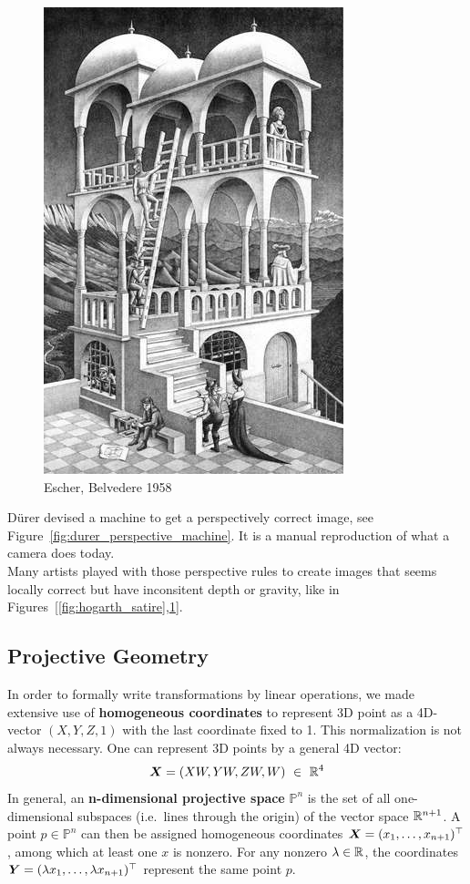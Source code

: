 \begin{figure}[h]
\centering
\includegraphics[width=0.5\columnwidth]{assets/img/escher_belvedere.jpg}
\caption{Escher, Belvedere 1958}%
\label{fig:escher_belvedere}
\end{figure}

D\"urer devised a machine to get a perspectively correct image,
see Figure~\ref{fig:durer_perspective_machine}.
It is a manual reproduction of what a camera does today.\\

Many artists played with those perspective rules to create images
that seems locally correct but have inconsitent depth or gravity, like
in Figures~[\ref{fig:hogarth_satire},\ref{fig:escher_belvedere}].


\subsection{Projective Geometry}%
\label{sub:projective_geometry}


In order to formally write transformations by linear operations,
we made extensive use of \textbf{homogeneous coordinates} to represent
3D point as a 4D-vector $(X,Y,Z,1)$ with the last coordinate fixed to 1.
This normalization is not always necessary. One can represent 3D points
by a general 4D vector:
\[
	\bm{X} = (XW, YW, ZW, W)\ \in\ \mathbb{R}^4
\]
In general, an \textbf{n-dimensional projective space} $\mathbb{P}^n$
is the set of all one-dimensional subspaces (i.e.\ lines through the origin)
of the vector space $\mathbb{R}^{n+1}$.
A point $p \in \mathbb{P}^n$ can then be assigned homogeneous coordinates
$\bm{X} = (x_1, \ldots, x_{n+1})^{\top}$, among which at least one $x$ is nonzero.
For any nonzero $\lambda \in \mathbb{R}$, the coordinates
$\bm{Y} = (\lambda x_1, \ldots, \lambda x_{n+1})^{\top}$
represent the same point $p$.


